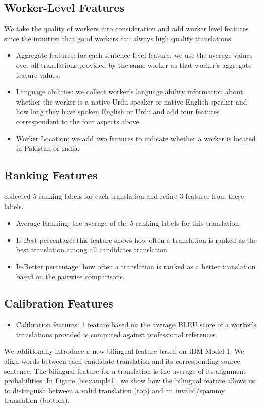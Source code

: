  \subsection{Worker-Level Features}
 We take the quality of workers into consideration and add worker level features since the intuition that good workers can always high quality translations.
\begin{itemize}
\item	Aggregate features:	for each sentence level feature, we use the average values over all translations provided by the same worker as that worker's aggregate feature values.
\item	Language abilities:	we collect worker's language ability information about whether the worker is a native Urdu speaker or native English speaker and how long they have spoken English or Urdu and add four features correspondent to the four aspects above.
\item	Worker Location:	we add two features to indicate whether a worker is located in Pakistan or India.
\end{itemize}
 \subsection{Ranking Features}
  collected 5 ranking labels for each translation and refine 3 features from these labels.
 \begin{itemize}
 \item Average Ranking:	the average of the 5 ranking labels for this translation.
 \item Is-Best percentage: this feature shows how often a translation is ranked as the best translation among all candidates translation.
 \item Is-Better percentage: how often a translation is ranked as a better translation based on the pairwise comparisons.
  \end{itemize}
 \subsection{Calibration Features}
 \begin{itemize}
 \item Calibration features: 1 feature based on the average BLEU score of a worker's translations provided is computed against professional references.
\end{itemize}

We additionally introduce a new bilingual feature based on IBM Model 1. We align words between each candidate translation and its corresponding source sentence. The bilingual feature for a translation is the average of its alignment probabilities. In Figure \ref{biexample1}, we show how the bilingual feature allows us to distinguish between a valid translation (top) and an invalid/spammy translation (bottom).

